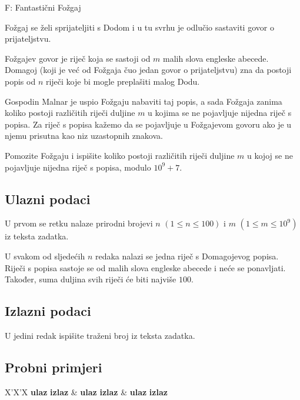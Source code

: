 \begin{statement}[
  timelimit=1 s,
  memorylimit=512 MiB,
]{F: Fantastični Fožgaj}

Fožgaj se želi sprijateljiti s Dodom i u tu svrhu je odlučio sastaviti govor o
prijateljstvu.

Fožgajev govor je riječ koja se sastoji od $m$ malih slova engleske abecede.
Domagoj (koji je već od Fožgaja čuo jedan govor o prijateljstvu) zna da postoji
popis od $n$ riječi koje bi mogle preplašiti malog Dodu.

Gospodin Malnar je uspio Fožgaju nabaviti taj popis, a sada Fožgaja zanima
koliko postoji različitih riječi duljine $m$ u kojima se ne pojavljuje nijedna
riječ s popisa. Za riječ s popisa kažemo da se pojavljuje u Fožgajevom govoru
ako je u njemu prisutna kao niz uzastopnih znakova.

Pomozite Fožgaju i ispišite koliko postoji različitih riječi duljine $m$ u kojoj
se ne pojavljuje nijedna riječ s popisa, modulo $10^9 + 7$.


\subsection*{Ulazni podaci}
U prvom se retku nalaze prirodni brojevi $n$ $(1 \le n \le 100)$ i
$m$ $(1 \le m \le 10^9)$ iz teksta zadatka.

U svakom od sljedećih $n$ redaka nalazi se jedna riječ s Domagojevog popisa.
Riječi s popisa sastoje se od malih slova engleske abecede i neće se ponavljati.
Također, suma duljina svih riječi će biti najviše $100$.

\subsection*{Izlazni podaci}
U jedini redak ispišite traženi broj iz teksta zadatka.

\subsection*{Probni primjeri}
\begin{tabularx}{\textwidth}{X'X'X}
  \textbf{ulaz}
  \linespread{1}{}
  \textbf{izlaz}
  \linespread{1}{} &
  \textbf{ulaz}
  \linespread{1}{}
  \textbf{izlaz}
  \linespread{1}{} &
  \textbf{ulaz}
  \linespread{1}{}
  \textbf{izlaz}
  \linespread{1}{}
\end{tabularx}

\end{statement}

